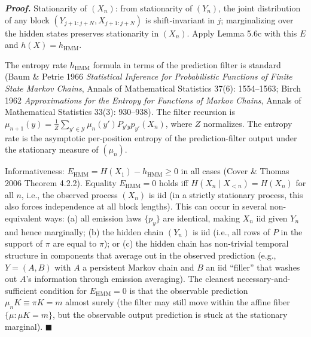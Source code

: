 \documentclass[
]{article}
\begin{document}
\emph{\textbf{Proof.}} Stationarity of $(X_n)$: from stationarity
of $(Y_n)$, the joint distribution of any block
$(Y_{j+1:j+N}, X_{j+1:j+N})$ is shift-invariant in $j$;
marginalizing over the hidden states preserves stationarity in
$(X_n)$. Apply Lemma 5.6c with this $E$ and $h(X) = h_{\mathrm{HMM}}$.

The entropy rate $h_{\mathrm{HMM}}$ formula in terms of the
prediction filter is standard (Baum \& Petrie 1966
\emph{Statistical Inference for Probabilistic Functions of Finite
State Markov Chains}, Annals of Mathematical Statistics 37(6):
1554--1563; Birch 1962 \emph{Approximations for the Entropy for
Functions of Markov Chains}, Annals of Mathematical Statistics
33(3): 930--938). The filter
recursion is $\mu_{n+1}(y) = \frac{1}{Z}
\sum_{y' \in \mathcal{Y}} \mu_n(y') P_{y' y} p_{y'}(X_n)$,
where $Z$ normalizes. The entropy rate
is the asymptotic per-position entropy of the prediction-filter
output under the stationary measure of $(\mu_n)$.

Informativeness: $E_{\mathrm{HMM}} = H(X_1) - h_{\mathrm{HMM}} \geq 0$ in
all cases (Cover \& Thomas 2006 Theorem 4.2.2). Equality
$E_{\mathrm{HMM}} = 0$ holds iff $H(X_n \mid X_{<n}) = H(X_n)$ for all $n$,
i.e., the observed process $(X_n)$ is iid (in a strictly stationary
process, this also forces independence at all block lengths). This can
occur in several non-equivalent ways: (a) all emission laws $\{p_y\}$
are identical, making $X_n$ iid given $Y_n$ and hence marginally;
(b) the hidden chain $(Y_n)$ is iid (i.e., all rows of $P$ in the
support of $\pi$ are equal to $\pi$); or (c) the hidden chain has non-trivial temporal structure
in components that average out in the observed prediction (e.g.,
$Y = (A, B)$ with $A$ a persistent Markov chain and $B$ an iid
``filler'' that washes out $A$'s information through emission averaging).
The cleanest necessary-and-sufficient condition for
$E_{\mathrm{HMM}} = 0$ is that the observable prediction
$\mu_n K \equiv \pi K = m$ almost surely (the filter may still move
within the affine fiber $\{\mu : \mu K = m\}$, but the observable output
prediction is stuck at the stationary marginal). \hfill$\blacksquare$
\end{document}
